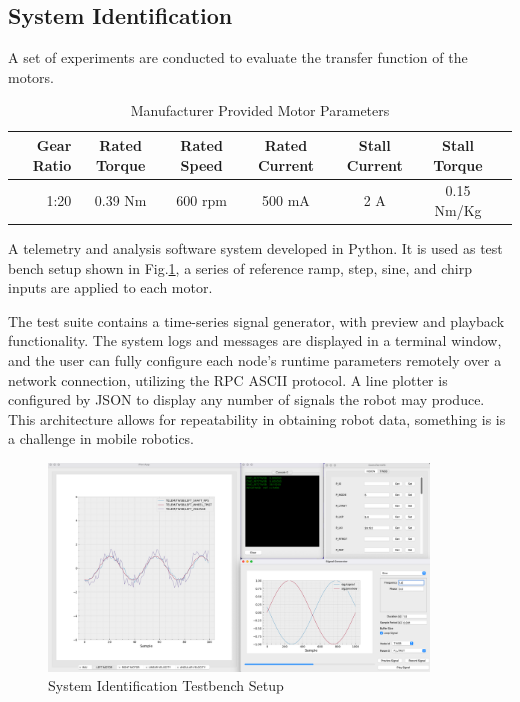         \subsection{System Identification}
        A set of experiments are conducted to evaluate the transfer function of the motors.

        \begin{table}[H]
            \centering
                \begin{tabular}{|r|c|c|c|c|c|c|}
                    \hline 
                    Gear Ratio & Rated Torque & Rated Speed  & Rated Current & Stall Current & Stall Torque \\
                    \hline
                     1:20  & 0.39 Nm & 600 rpm & 500 mA & 2 A & 0.15 Nm/Kg \\
                    \hline
                \end{tabular}
                \caption{Manufacturer Provided Motor Parameters}
        \end{table}

        A telemetry and analysis software system developed in Python. It is used as 
        test bench  setup shown in Fig.\ref{fig:SysIDSetUp}, a series of reference 
        ramp, step, sine, and chirp inputs are applied to each motor.

        The test suite contains a time-series signal generator, with preview and playback functionality.
        The system logs and messages are displayed in a terminal window, and the user can fully configure 
        each node's runtime parameters remotely over a network connection, utilizing the RPC ASCII protocol.
        A line plotter is configured by JSON to display any number of signals the robot may produce.
        This architecture allows for repeatability in obtaining robot data, something 
        is is a challenge in mobile robotics.
        
        \begin{figure}[H]
            \centering
            \includegraphics[width=0.9\textwidth]{SysIDMotorSetUp.png}
            \caption{System Identification Testbench Setup}
            \label{fig:SysIDSetUp}
        \end{figure}
      
